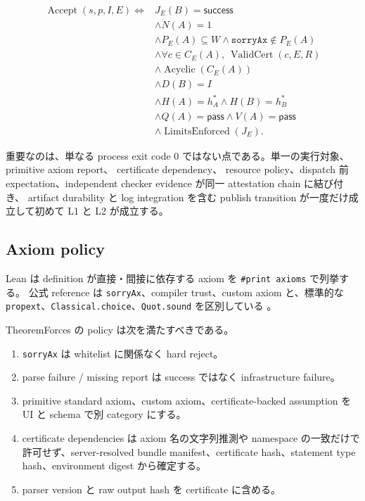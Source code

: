 \documentclass[a4paper,11pt]{ltjsarticle}
\begin{document}
\begin{equation}
\begin{split}
\operatorname{Accept}(s,p,I,E) \iff {} & J_E(B)=\textsf{success} \\
& \land N(A)=1 \\
& \land P_E(A)\subseteq W
  \land \texttt{sorryAx}\notin P_E(A) \\
& \land \forall c\in C_E(A),\ \operatorname{ValidCert}(c,E,R) \\
& \land \operatorname{Acyclic}(C_E(A)) \\
& \land D(B)=I \\
& \land H(A)=h_A^\ast \land H(B)=h_B^\ast \\
& \land Q(A)=\textsf{pass} \land V(A)=\textsf{pass} \\
& \land \operatorname{LimitsEnforced}(J_E).
\end{split}
\end{equation}

重要なのは、単なる process exit code 0 ではない点である。単一の実行対象、primitive axiom report、
certificate dependency、
resource policy、dispatch 前 expectation、independent checker evidence が同一 attestation chain に結び付き、
artifact durability と log integration を含む publish transition が一度だけ成立して初めて L1 と L2 が成立する。

\subsection{Axiom policy}

Lean は definition が直接・間接に依存する axiom を \texttt{\#print axioms} で列挙する。
公式 reference は \texttt{sorryAx}、compiler trust、custom axiom と、標準的な
\texttt{propext}、\texttt{Classical.choice}、\texttt{Quot.sound} を区別している
\cite{leanaxioms,leanvalidate}。

TheoremForces の policy は次を満たすべきである。

\begin{enumerate}
  \item \texttt{sorryAx} は whitelist に関係なく hard reject。
  \item parse failure / missing report は success ではなく infrastructure failure。
  \item primitive standard axiom、custom axiom、certificate-backed assumption を UI と schema で別 category にする。
  \item certificate dependencies は axiom 名の文字列推測や namespace の一致だけで許可せず、server-resolved bundle
        manifest、certificate hash、statement type hash、environment digest から確定する。
  \item parser version と raw output hash を certificate に含める。
\end{enumerate}
\end{document}
